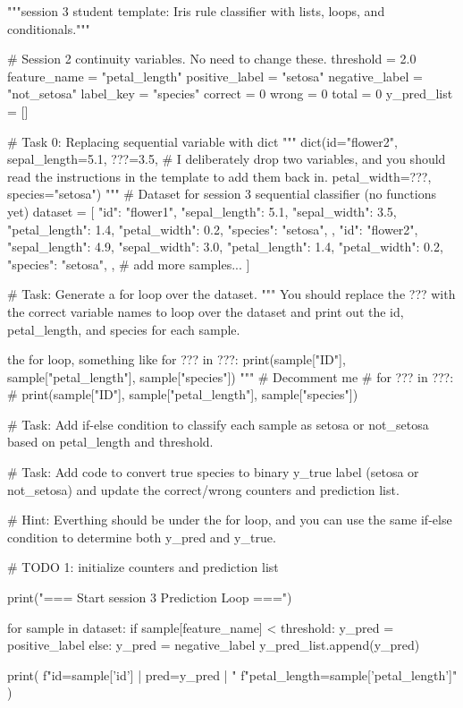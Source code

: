 """session 3 student template: Iris rule classifier with lists, loops, and conditionals."""


# Session 2 continuity variables. No need to change these.
threshold = 2.0
feature_name = "petal_length"
positive_label = "setosa"
negative_label = "not_setosa"
label_key = "species"
correct = 0
wrong = 0
total = 0
y_pred_list = []


# Task 0: Replacing sequential variable with dict
"""
dict(id="flower2", 
sepal_length=5.1,
 ???=3.5, 
 # I deliberately drop two variables, and you should read the instructions in the template to add them back in. 
 petal_width=???, 
 species="setosa")
"""
# Dataset for session 3 sequential classifier (no functions yet)
dataset = [
    {
        "id": "flower1",
        "sepal_length": 5.1,
        "sepal_width": 3.5,
        "petal_length": 1.4,
        "petal_width": 0.2,
        "species": "setosa",
    },
    {
        "id": "flower2",
        "sepal_length": 4.9,
        "sepal_width": 3.0,
        "petal_length": 1.4,
        "petal_width": 0.2,
        "species": "setosa",
    },
    # add more samples...
]

# Task: Generate a for loop over the dataset.
"""
You should replace the ??? with the correct variable names to loop over the dataset and print out the id, petal_length, and species for each sample.

 the for loop, something like
for ??? in ???:
    print(sample["ID"], sample["petal_length"], sample["species"])
"""
# Decomment me
# for ??? in ???:
# print(sample["ID"], sample["petal_length"], sample["species"])

#   Task: Add if-else condition to classify each sample as setosa or not_setosa based on petal_length and threshold.

#   Task: Add code to convert true species to binary y_true label (setosa or not_setosa) and update the correct/wrong counters and prediction list.


# Hint: Everthing should be under the for loop, and you can use the same if-else condition to determine both y_pred and y_true.


# TODO 1: initialize counters and prediction list

print("\n=== Start session 3 Prediction Loop ===")


for sample in dataset:
    if sample[feature_name] < threshold:
        y_pred = positive_label
    else:
        y_pred = negative_label
    y_pred_list.append(y_pred)

    print(
        f"id={sample['id']} | pred={y_pred} | "
        f"petal_length={sample['petal_length']}"
    )


